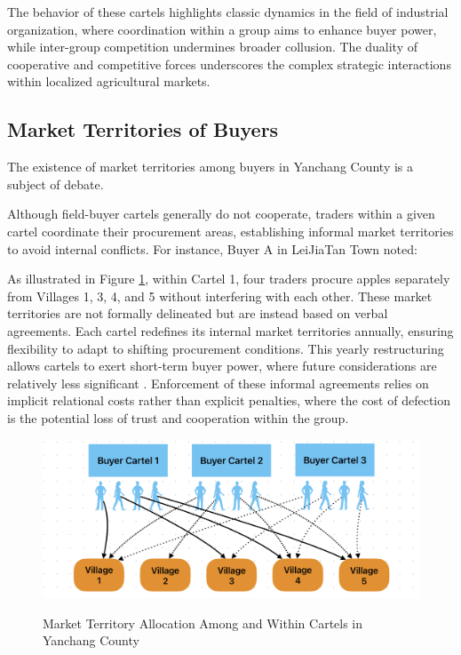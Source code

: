 The behavior of these cartels highlights classic dynamics in the field of industrial organization, where coordination within a group aims to enhance buyer power, while inter-group competition undermines broader collusion. The duality of cooperative and competitive forces underscores the complex strategic interactions within localized agricultural markets.



\subsection{Market Territories of Buyers}
The existence of market territories among buyers in Yanchang County is a subject of debate.

Although field-buyer cartels generally do not cooperate, traders within a given cartel coordinate their procurement areas, establishing informal market territories to avoid internal conflicts. For instance, Buyer A in LeiJiaTan Town noted: 

\begin{quote}
\end{quote}

As illustrated in Figure \ref{fig: Market Territory}, within Cartel 1, four traders procure apples separately from Villages 1, 3, 4, and 5 without interfering with each other. These market territories are not formally delineated but are instead based on verbal agreements. Each cartel redefines its internal market territories annually, ensuring flexibility to adapt to shifting procurement conditions. This yearly restructuring allows cartels to exert short-term buyer power, where future considerations are relatively less significant \citep{sexton2013market}. Enforcement of these informal agreements relies on implicit relational costs rather than explicit penalties, where the cost of defection is the potential loss of trust and cooperation within the group.

\begin{figure}[hpt]
    \centering
        \caption{Market Territory Allocation Among and Within Cartels in Yanchang County}
    \includegraphics[width=\linewidth]{Figures/Market_Territory.png}
    \label{fig: Market Territory}
\end{figure}

